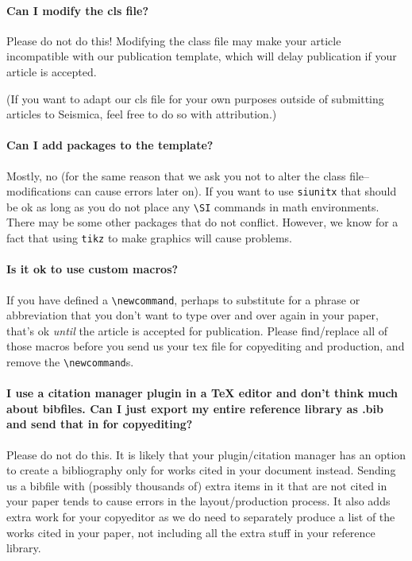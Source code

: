 \documentclass[]{seismica}
\begin{document}
    \paragraph{Can I modify the cls file?} Please do not do this! Modifying the class file may make your article incompatible with our publication template, which will delay publication if your article is accepted.

    (If you want to adapt our cls file for your own purposes outside of submitting articles to Seismica, feel free to do so with attribution.)

    \paragraph{Can I add packages to the template?} Mostly, no (for the same reason that we ask you not to alter the class file--modifications can cause errors later on). If you want to use \texttt{siunitx} that should be ok as long as you do not place any \texttt{\textbackslash SI} commands in math environments. There may be some other packages that do not conflict. However, we know for a fact that using \texttt{tikz} to make graphics will cause problems.

    \paragraph{Is it ok to use custom macros?} If you have defined a \texttt{\textbackslash newcommand}, perhaps to substitute for a phrase or abbreviation that you don't want to type over and over again in your paper, that's ok \textit{until} the article is accepted for publication. Please find/replace all of those macros before you send us your tex file for copyediting and production, and remove the \texttt{\textbackslash newcommand}s.

    \paragraph{I use a citation manager plugin in a TeX editor and don't think much about bibfiles. Can I just export my entire reference library as .bib and send that in for copyediting?} Please do not do this. It is likely that your plugin/citation manager has an option to create a bibliography only for works cited in your document instead. Sending us a bibfile with (possibly thousands of) extra items in it that are not cited in your paper tends to cause errors in the layout/production process. It also adds extra work for your copyeditor as we do need to separately produce a list of the works cited in your paper, not including all the extra stuff in your reference library.
\end{document}
